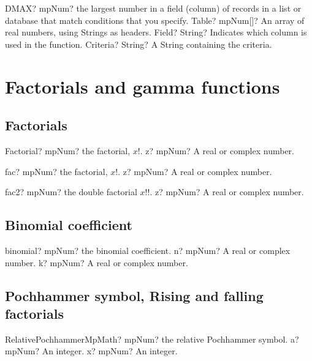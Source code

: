 \documentclass[12pt,a4paper,openany]{book}
\begin{document}
\begin{mpFunctionsExtract}
\mpWorksheetFunctionThreeNotImplemented
{DMAX? mpNum? the largest number in a field (column) of records in a list or database that match conditions that you specify.}
{Table? mpNum[]? An array of real numbers, using Strings as headers.}
{Field? String? Indicates which column is used in the function.}
{Criteria? String? A String containing the criteria.}
\end{mpFunctionsExtract}

\chapter{Factorials and gamma functions}

\section{Factorials}

\begin{mpFunctionsExtract}
\mpFunctionOne
{Factorial? mpNum? the factorial, $x!$.}
{z? mpNum? A real or complex number.}
\end{mpFunctionsExtract}

\begin{mpFunctionsExtract}
\mpFunctionOne
{fac? mpNum? the factorial, $x!$.}
{z? mpNum? A real or complex number.}
\end{mpFunctionsExtract}

\begin{mpFunctionsExtract}
\mpFunctionOne
{fac2? mpNum? the double factorial $x!!$.}
{z? mpNum? A real or complex number.}
\end{mpFunctionsExtract}

\section{Binomial coefficient}

\begin{mpFunctionsExtract}
\mpFunctionTwo
{binomial? mpNum? the binomial coefficient.}
{n? mpNum? A real or complex number.}
{k? mpNum? A real or complex number.}
\end{mpFunctionsExtract}

\section{Pochhammer symbol, Rising and falling factorials}

\begin{mpFunctionsExtract}
\mpFunctionTwoNotImplemented
{RelativePochhammerMpMath? mpNum? the relative Pochhammer symbol.}
{a? mpNum? An integer.}
{x? mpNum? An integer.}
\end{mpFunctionsExtract}
\end{document}
